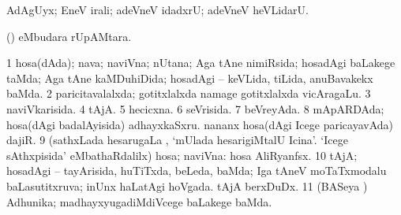 \bentry
{}
\gl{\kirxvi}
\bmng
AdAgUyx; EneV irali; adeVneV idadxrU; adeVneV heVLidarU. 
\emng
\eentry

\bentry
{}
\gl{\nA}
\bmng
(\ame)  eMbudara rUpAMtara. 
\emng
\eentry

\bentry
{}
\gl{\gu}
\bmng
\bnum
\num{1} hosa(dAda); nava; naviVna; nUtana; Aga tAne nimiRsida; hosadAgi baLakege taMda; Aga tAne kaMDuhiDida; hosadAgi -- keVLida, tiLida, anuBavakekx baMda. 
\num{2} paricitavalalxda; gotitxlalxda  namage gotitxlalxda vicAragaLu. 
\num{3} naviVkarisida. 
\num{4} tAjA. 
\num{5} hecicxna. 
\num{6} seVrisida. 
\num{7} beVreyAda. 
\num{8} mApARDAda;  hosa(dAgi badalAyisida) adhayxkaSxru.  nananx hosa(dAgi Icege paricayavAda) dajiR. 
\num{9} (sathxLada hesarugaLa \vi, `mUlada hesarigiMtalU Icina'. `Icege sAthxpisida' eMbathaRdalilx) hosa; naviVna: hosa AliRyanfsx. 
\num{10} tAjA; hosadAgi -- tayArisida, huTiTxda, beLeda, baMda; Iga tAneV moTaTxmodalu baLasutitxruva; inUnx haLatAgi hoVgada.  tAjA berxDuDx. 
\num{11} (BASeya \vi) Adhunika; madhayxyugadiMdiVcege baLakege baMda. 
\enum
\emng

